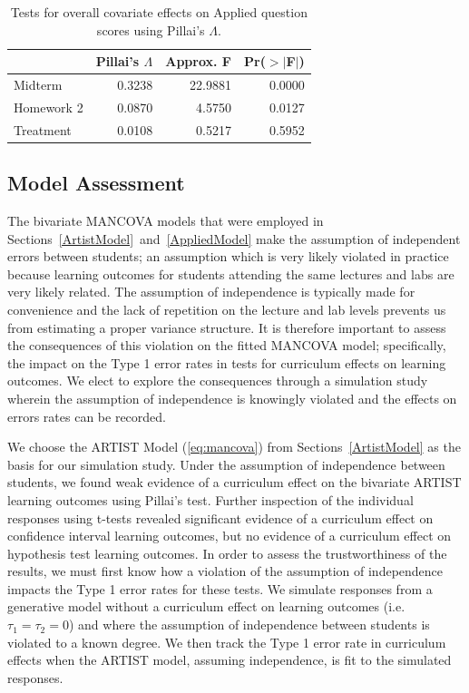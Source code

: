 \documentclass[11pt]{isuthesis}\usepackage[]{graphicx}\usepackage[]{color}
\newcommand{\km}[1]{{\color{red} #1}}
\begin{document}
\begin{table}[hbtp]
\centering
\begin{tabular}{lrrr} \hline
 & Pillai's $\Lambda$ & Approx. F & Pr($>$$|$F$|$)\\ 
 \hline  
Midterm & 0.3238 & 22.9881 &
0.0000\\ 
Homework 2 & 0.0870 & 4.5750 &
0.0127\\ 
Treatment & 0.0108 & 0.5217 &
0.5952\\ 
\hline
\end{tabular}
\caption{Tests for overall covariate effects on Applied question scores using Pillai's $\Lambda$.}
\label{tab:overallmod1}

\end{table}



\km{
\subsection{Model Assessment}
\label{SimStudy}

The bivariate MANCOVA models that were employed in Sections~\ref{ArtistModel}~and~\ref{AppliedModel} make the assumption of independent errors between students; an assumption which is very likely violated in practice because learning outcomes for students attending the same lectures and labs are very likely related. The assumption of independence is typically made for convenience and the lack of repetition on the lecture and lab levels prevents us from estimating a proper variance structure. It is therefore important to assess the consequences of this violation on the fitted MANCOVA model; specifically, the impact on the Type 1 error rates in tests for curriculum effects on learning outcomes. We elect to explore the consequences through a simulation study wherein the assumption of independence is knowingly violated and the effects on errors rates can be recorded.}

\km{We choose the ARTIST Model (\ref{eq:mancova}) from Sections~\ref{ArtistModel} as the basis for our simulation study. Under the assumption of independence between students, we found weak evidence of a curriculum effect on the bivariate ARTIST learning outcomes using Pillai's test. Further inspection of the individual responses using t-tests revealed significant evidence of a curriculum effect on confidence interval learning outcomes, but no evidence of a curriculum effect on hypothesis test learning outcomes. In order to assess the trustworthiness of the results, we must first know how a violation of the assumption of independence impacts the Type 1 error rates for these tests. We simulate responses from a generative model without a curriculum effect on learning outcomes (i.e.\ $\tau_{1} = \tau_{2} = 0$) and where the assumption of independence between students is violated to a known degree. We then track the Type 1 error rate in curriculum effects when the ARTIST model, assuming independence, is fit to the simulated responses.}
\end{document}
